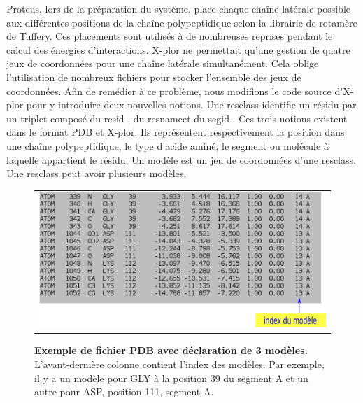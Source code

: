 Proteus, lors de la préparation du système, place chaque chaîne latérale possible aux différentes positions de la chaîne polypeptidique selon la librairie de rotamère de Tuffery. Ces placements sont utilisés à de nombreuses reprises pendant le calcul des énergies d'interactions. X-plor ne permettait qu'une gestion de quatre jeux de coordonnées pour une chaîne latérale simultanément. Cela oblige l'utilisation de nombreux fichiers pour stocker l'ensemble des jeux de coordonnées. Afin de remédier à ce problème, nous modifions le code source d'X-plor pour y introduire deux nouvelles notions. Une \og resclass \fg identifie un résidu par un triplet composé du \og resid \fg, du \og resname\fg et du \og segid \fg. Ces trois notions existent dans le format PDB et X-plor. Ils représentent respectivement la position dans une chaîne polypeptidique, le type d'acide aminé, le segment ou molécule à laquelle appartient le résidu. Un \og modèle \fg est un jeu de coordonnées d'une resclass. Une resclass peut avoir plusieurs modèles.
   \begin{figure}[!htbp]
     \centering
     \begin{tabular}{c}
       \includegraphics[width=13cm]{figure/PDB.png} 
     \end{tabular}     
     \caption{\textbf{Exemple de fichier PDB avec déclaration de 3 modèles.} L'avant-dernière colonne contient l'index des modèles. Par exemple, il y a un modèle pour GLY à la position 39 du segment A et un autre pour ASP, position 111, segment A.}
\label{fig:PDB}
   \end{figure}

